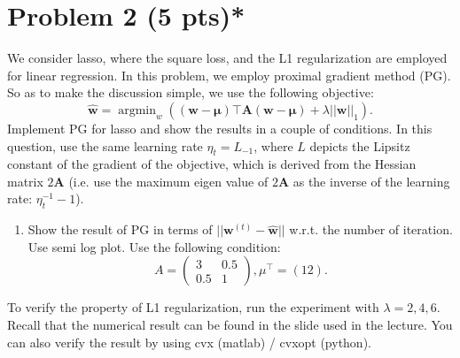 \documentclass{jsarticle}
\DeclareMathOperator*{\argmin}{argmin}
\begin{document}
\section*{Problem 2 (5 pts)*}
We consider lasso, where the square loss, and the L1 regularization are employed for linear regression. In this problem, we employ proximal gradient method (PG). So as to make the discussion simple, we use the following objective:
$$ \hat{\bm w} = \argmin_{w} \left((\bm w-\bm\mu)\top \bm A(\bm w-\bm\mu)+\lambda||\bm w||_1\right). $$
Implement PG for lasso and show the results in a couple of conditions. In this question, use the same learning rate $\eta_t = L_{−1}$, where $L$ depicts the Lipsitz constant of the gradient of the objective, which is derived from the Hessian matrix $2\bm A$ (i.e. use the maximum eigen value of $2\bm A$ as the inverse of the learning rate: $\eta_t^{-1}−1$).
\begin{enumerate}
  \item Show the result of PG in terms of $||\bm w^{(t)} − \hat{\bm w}||$ w.r.t. the number of iteration. Use semi log plot. Use the following condition:
  $$A=\begin{pmatrix}
  3& 0.5 \\
  0.5& 1
  \end{pmatrix}, \mu^\top=(1 2).$$
\end{enumerate}
To verify the property of L1 regularization, run the experiment with $\lambda = 2, 4, 6$. Recall that the numerical result can be found in the slide used in the lecture. You can also verify the result by using cvx (matlab) / cvxopt (python).
\end{document}
